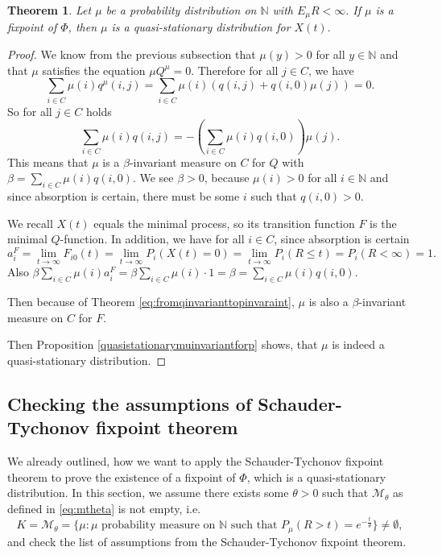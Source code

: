 \documentclass[12pt,a4paper]{scrartcl}
\newtheorem{theorem}{Theorem}[section]
\numberwithin{equation}{section}
\newcommand{\N}{\mathbb{N}} %
\begin{document}
\begin{theorem}
Let $\mu$ be a probability distribution on $\N$ with $E_{\mu} R < \infty.$ If $\mu$ is a fixpoint of $\Phi$, then $\mu$ is a quasi-stationary distribution for $X\left(t\right).$
\end{theorem}
\begin{proof}
We know from the previous subsection that $\mu\left(y\right) > 0$ for all $y \in \N$ and that $\mu$ satisfies the equation $\mu Q^{\mu} = 0$. Therefore for all $ j \in C$, we have
$$\sum_{i \in C} \mu\left(i\right) q^{\mu}\left(i,j\right) = \sum_{i \in C} \mu\left(i\right) \left(q\left(i,j\right) + q\left(i,0\right) \mu\left(j\right) \right) = 0.$$ So for all $j \in C$ holds
$$\sum_{i \in C} \mu\left(i\right) q\left(i,j\right) = -\left(\sum_{i \in C} \mu\left(i\right) q\left(i,0\right) \right) \mu\left(j\right).$$
This means that $\mu$ is a $\beta$-invariant measure on $C$ for $Q$ with $\beta = \sum_{i \in C} \mu\left(i\right) q\left(i,0\right)$. We see $\beta > 0$, because $\mu\left(i\right) > 0$ for all $i \in \N$ and since absorption is certain, there must be some $i$ such that $q\left(i,0\right) > 0.$  

We recall $X\left(t\right)$ equals the minimal process, so its transition function $F$ is the minimal $Q$-function. In addition, we have for all $i \in C$, since absorption is certain
$$a_i^F = \lim_{t \to \infty} F_{i0}\left(t\right) = \lim_{t \to \infty} P_i\left(X\left(t\right)=0 \right) = \lim_{t \to \infty} P_i\left(R \leq t\right) = P_i\left(R < \infty\right) = 1. $$
Also $\beta \sum_{i \in C} \mu\left(i\right) a_i^F = \beta \sum_{i \in C} \mu\left(i\right) \cdot 1 = \beta = \sum_{i \in C} \mu\left(i\right) q\left(i,0\right).$

Then because of Theorem \ref{eq:fromqinvarianttopinvaraint}, $\mu$ is also a $\beta$-invariant measure on $C$ for $F$.

Then Proposition \ref{quasistationarymuinvariantforp} shows, that $\mu$ is indeed a quasi-stationary distribution.
\end{proof}


\subsection{Checking the assumptions of Schauder-Tychonov fixpoint theorem} \label{subsectiontychonov}

We already outlined, how we want to apply the Schauder-Tychonov fixpoint theorem to prove the existence of a fixpoint of $\Phi$, which is a quasi-stationary distribution. In this section, we assume there exists some $\theta > 0$ such that $\mathcal{M}_\theta$ as defined in \eqref{eq:mtheta} is not empty, i.e.
$$K = \mathcal{M}_{\theta} = \lbrace  \mu : \mu \text{ probability measure on } \N \text{ such that } P_{\mu}\left(R>t\right) = e^{-\frac{t}{\theta}}\rbrace \neq \emptyset,$$
and check the list of assumptions from the Schauder-Tychonov fixpoint theorem.
\end{document}
